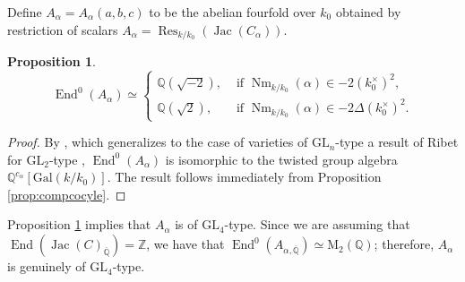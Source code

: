 \documentclass[oneside]{amsart}
\newtheorem{proposition}[theorem]{Proposition}
\theoremstyle{remark}
\newcommand{\on}{\operatorname }
\newcommand{\Q}{\mathbb Q}
\newcommand{\Qbar}{{\overline{\mathbb Q}}}
\newcommand{\Gal}{\mathrm{Gal}}
\newcommand{\Z}{\mathbb Z}
\newcommand{\GL}{\mathrm{GL}}
\newcommand{\M}{\mathrm{M }}
\newcommand{\End}{\operatorname{End}}
\newcommand{\Jac}{\operatorname{Jac}}
\newcommand{\Res}{\operatorname{Res}}
\numberwithin{equation}{section}
\begin{document}
Define $A_\alpha=A_\alpha(a,b,c)$ to be the abelian fourfold over $k_0$ obtained by restriction of scalars $A_\alpha =\Res_{k/k_0}(\Jac(C_\alpha))$.
\begin{proposition}\label{prop:endalg}
  \[
    \End^0(A_\alpha)\simeq   \begin{cases}
    \Q(\sqrt{-2}),&\text{ if }\on{Nm}_{k/k_0}(\alpha) \in -2(k_0^\times)^2,\\
    \Q(\sqrt{2}),&\text{ if }\on{Nm}_{k/k_0}(\alpha) \in -2\Delta(k_0^\times)^2.
    \end{cases}
\]
\end{proposition}
\begin{proof}
  By \cite[Proposition 5.32]{Gui10}, which generalizes to the case of varieties of $\GL_n$-type a result of Ribet for $\GL_2$-type \cite[Lemma 6.4]{Rib92},   $\End^0(A_\alpha)$ is isomorphic to the twisted group algebra $\Q^{c_\alpha}[\Gal(k/k_0)]$. The result follows immediately from Proposition \ref{prop:compcocyle}.

\end{proof}
Proposition \ref{prop:endalg} implies that $A_\alpha$ is of $\GL_4$-type. Since we are assuming that $\End(\Jac(C)_\Qbar)=\Z$, we have that $\End^0(A_{\alpha,\Qbar})\simeq \M_2(\Q)$; therefore, $A_\alpha$ is genuinely of $\GL_4$-type.
\end{document}
